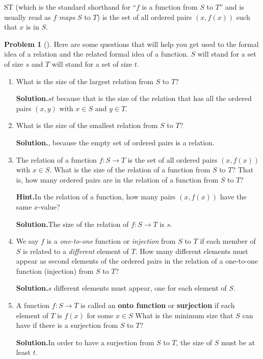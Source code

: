 \documentclass[10pt,]{book}
\newcommand{\terminology}[1]{\textbf{#1}}
\theoremstyle{plain}
\theoremstyle{definition}
\newtheorem{activity}[project]{Problem}
\theoremstyle{definition}
\numberwithin{equation}{chapter}
\begin{document}
S\rightarrow T\) (which is the standard shorthand for ``\(f\) is a function from \(S\) to \(T\)'' and is usually read as \(f\) \emph{maps} \(S\) to \(T\)) is the set of all ordered pairs \((x,f(x))\) such that \(x\) is in \(S\).%
\begin{activity}[]\label{formalrelations}
Here are some questions that will help you get used to the formal idea of a relation and the related formal idea of a function. \(S\) will stand for a set of size \(s\) and \(T\) will stand for a set of size \(t\).%
\begin{enumerate}[font=\bfseries,label=(\alph*),ref=\alph*]
\item\label{task-231} What is the size of the largest relation from \(S\) to \(T\)?%
\par\medskip\noindent%
\textbf{Solution.}\quad \(st\) because that is the size of the relation that has all the ordered pairs \((x,y)\) with \(x\in S\) and \(y\in T\).%
\item\label{task-232} What is the size of the smallest relation from \(S\) to \(T\)?%
\par\medskip\noindent%
\textbf{Solution.}, because the empty set of ordered pairs is a relation.%
\item\label{task-233} The relation of a function \(f:S\rightarrow T\) is the set of all ordered pairs \((x,f(x))\) with \(x\in S\).  What is the size of the relation of a function from \(S\) to \(T\)?  That is, how many ordered pairs are in the relation of a function from \(S\) to \(T\)?%
\par\medskip\noindent%
\textbf{Hint.}\quad In the relation of a function, how many pairs \((x, f (x))\) have the same \(x\)-value?%
\par\medskip\noindent%
\textbf{Solution.}\quad The size of the relation of \(f:S\rightarrow T\) is \(s\).%
\item\label{task-234} We say \(f\) is a \emph{one-to-one} function or \emph{injection} from \(S\) to \(T\) if each member of \(S\) is related to a \emph{different} element of \(T\). How many different elements must appear as second elements of the ordered pairs in the relation of a one-to-one function (injection) from \(S\) to \(T\)?%
\par\medskip\noindent%
\textbf{Solution.}\quad \(s\) different elements must appear, one for each element of \(S\).%
\item\label{onto} A function \(f:S\rightarrow T\) is called an \terminology{onto function} or \terminology{surjection} if each element of \(T\) is \(f(x)\) for some \(x\in S\) What is the minimum size that \(S\) can have if there is a  surjection from \(S\) to \(T\)?%
\par\medskip\noindent%
\textbf{Solution.}\quad In order to have a surjection from \(S\) to \(T\), the size of \(S\) must be at least \(t\).%
\end{enumerate}
\end{activity}
\end{document}
